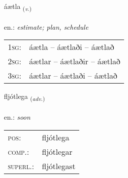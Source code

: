 \documentclass[frontgrid, backgrid]{flacards}\usepackage[]{graphicx}\usepackage[]{xcolor}
\begin{document}
\renewcommand{\flhead}{\vskip5pt \fboxsep=0pt {\small\bfseries\footnotesize Sagnorð | Verb}}
\renewcommand{\fcfoot}{\vskip5pt \fboxsep=0pt \hspace{2pt}{\small\bfseries\footnotesize 2K}}

\renewcommand{\blhead}{\vskip5pt {\small\bfseries\footnotesize Sagnorð | Verb }}
\renewcommand{\bcfoot}{\vskip5pt \hspace{2pt}{\small\bfseries\footnotesize 2K}}


{áætla \small{\textsubscript{(\textit{v.})}} \\[1ex] %
\textphonetic{[auːaihtla]} \\
en.: \emph{estimate; plan, schedule} \\  [2ex]
\renewcommand*{\arraystretch}{0.8}
\begin{tabular}{p{1cm}l}
\textsc{1sg}: & áætla -- áætlaði -- áætlað \\ 
\textsc{2sg}: & áætlar -- áætlaðir -- áætlað \\ 
\textsc{3sg}: & áætlar -- áætlaði -- áætlað \\ 
\end{tabular}
}

\renewcommand{\flhead}{\vskip5pt \fboxsep=0pt {\small\bfseries\footnotesize Atviksorð | Adverb}}
\renewcommand{\fcfoot}{\vskip5pt \fboxsep=0pt \hspace{2pt}{\small\bfseries\footnotesize 2K}}

\renewcommand{\blhead}{\vskip5pt {\small\bfseries\footnotesize Atviksorð | Adverb }}
\renewcommand{\bcfoot}{\vskip5pt \hspace{2pt}{\small\bfseries\footnotesize 2K}}


{fljótlega \small{\textsubscript{(\textit{adv.})}} \\[1ex] %
\textphonetic{[fljoutlɛɣa]} \\
en.: \emph{soon} \\  [2ex]
\renewcommand*{\arraystretch}{0.8}
\begin{tabular}{ll}
\textsc{pos}: & fljótlega \\ 
\textsc{comp.}: & fljótlegar \\ 
\textsc{superl.}: & fljótlegast \\
\end{tabular}
}
\end{document}
